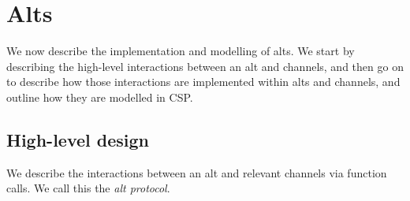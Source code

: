 \section{Alts}
\label{sec:alt}

\inlineScala

We now describe the implementation and modelling of alts.  We start by
describing the high-level interactions between an alt and channels, and then
go on to describe how those interactions are implemented within alts and
channels, and outline how they are modelled in CSP.


\subsection{High-level design}

We describe the interactions between an alt and relevant channels via function
calls.  We call this the \emph{alt protocol}. 

